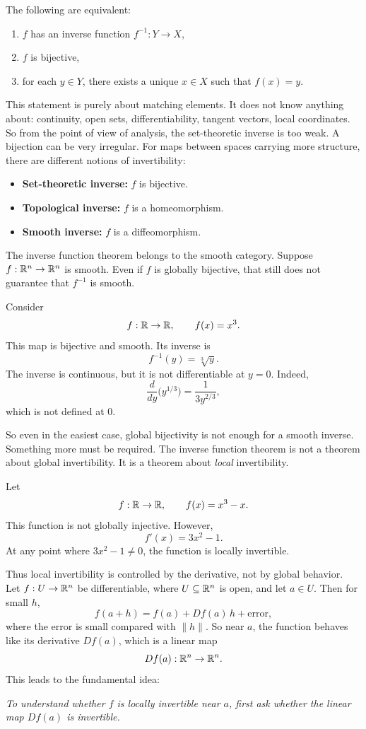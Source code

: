 \begin{proposition}
The following are equivalent:
\begin{enumerate}[label=(\arabic*)]
    \item \(f\) has an inverse function \(f^{-1}:Y\to X\),
    \item \(f\) is bijective,
    \item for each \(y\in Y\), there exists a unique \(x\in X\) such that \(f(x)=y\).
\end{enumerate}
\end{proposition}
This statement is purely about matching elements. It does not know anything about: continuity, open sets, differentiability, tangent vectors, local coordinates.
So from the point of view of analysis, the set-theoretic inverse is too weak. A bijection can be very irregular.
For maps between spaces carrying more structure, there are different notions of invertibility:
\begin{itemize}
    \item \textbf{Set-theoretic inverse:} \(f\) is bijective.
    \item \textbf{Topological inverse:} \(f\) is a homeomorphism.
    \item \textbf{Smooth inverse:} \(f\) is a diffeomorphism.
\end{itemize}
The inverse function theorem belongs to the smooth category. Suppose \(f:\mathbb{R}^n\to\mathbb{R}^n\) is smooth. Even if \(f\) is globally bijective, that still does not guarantee that \(f^{-1}\) is smooth.
\begin{example}
Consider
\[
f:\mathbb{R}\to\mathbb{R},\qquad f(x)=x^3.
\]
This map is bijective and smooth. Its inverse is
\[
f^{-1}(y)=\sqrt[3]{y}.
\]
The inverse is continuous, but it is not differentiable at \(y=0\). Indeed,
\[
\frac{d}{dy}\bigl(y^{1/3}\bigr)=\frac{1}{3y^{2/3}},
\]
which is not defined at \(0\).
\end{example}
So even in the easiest case, global bijectivity is not enough for a smooth inverse. Something more must be required.
The inverse function theorem is not a theorem about global invertibility. It is a theorem about \emph{local} invertibility.
\begin{example}
Let
\[
f:\mathbb{R}\to\mathbb{R},\qquad f(x)=x^3-x.
\]
This function is not globally injective. However,
\[
f'(x)=3x^2-1.
\]
At any point where \(3x^2-1\neq 0\), the function is locally invertible.
\end{example}
Thus local invertibility is controlled by the derivative, not by global behavior.
~\\
Let \(f:U\to\mathbb{R}^n\) be differentiable, where \(U\subseteq \mathbb{R}^n\) is open, and let \(a\in U\). Then for small \(h\),
\[
f(a+h)=f(a)+Df(a)\,h+\text{error},
\]
where the error is small compared with \(\|h\|\). So near \(a\), the function behaves like its derivative \(Df(a)\), which is a linear map
\[
Df(a):\mathbb{R}^n\to\mathbb{R}^n.
\]
This leads to the fundamental idea:
\begin{center}
\emph{To understand whether \(f\) is locally invertible near \(a\), first ask whether the linear map \(Df(a)\) is invertible.}
\end{center}

